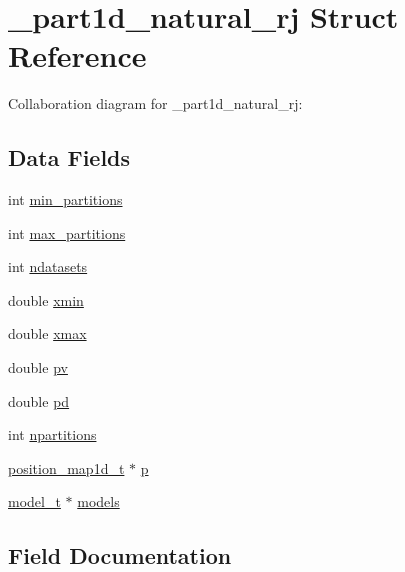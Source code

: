\hypertarget{struct__part1d__natural__rj}{}\section{\+\_\+part1d\+\_\+natural\+\_\+rj Struct Reference}
\label{struct__part1d__natural__rj}


Collaboration diagram for \+\_\+part1d\+\_\+natural\+\_\+rj\+:
\subsection*{Data Fields}
\begin{DoxyCompactItemize}
\item 
int \hyperlink{struct__part1d__natural__rj_a6969dd7fd19ea22e56d7ae5d98628118}{min\+\_\+partitions}
\item 
int \hyperlink{struct__part1d__natural__rj_a4c63d3589ddf066362e9c1aeeff6cc40}{max\+\_\+partitions}
\item 
int \hyperlink{struct__part1d__natural__rj_acae391f3796a41637af945a56533254b}{ndatasets}
\item 
double \hyperlink{struct__part1d__natural__rj_adb78cdc9ded6916d88a590efdb6f03e9}{xmin}
\item 
double \hyperlink{struct__part1d__natural__rj_ade35da3c6eca825d12726dba6dffeef9}{xmax}
\item 
double \hyperlink{struct__part1d__natural__rj_a90b7c2ee4e95d8f74c8431cc146f977d}{pv}
\item 
double \hyperlink{struct__part1d__natural__rj_a6bb0aa07bf2e8404a955bbc64179f5d6}{pd}
\item 
int \hyperlink{struct__part1d__natural__rj_a15524ba9fc8ce1ed63a752e437723feb}{npartitions}
\item 
\hyperlink{position__map1d_8h_aced1bad6e33e2b5679d6d06747735cf6}{position\+\_\+map1d\+\_\+t} $\ast$ \hyperlink{struct__part1d__natural__rj_a51b2e7594b812e17cc93d392b4490cf4}{p}
\item 
\hyperlink{part1d__forwardmodel_8c_a0a038e31b1f765296a40c2da07b46a84}{model\+\_\+t} $\ast$ \hyperlink{struct__part1d__natural__rj_a9176ec71daa9e38e433a99d2bb26812d}{models}
\end{DoxyCompactItemize}


\subsection{Field Documentation}
